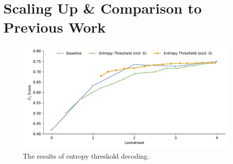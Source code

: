 \documentclass[bsc,deptreport,ai]{infthesis} %
\begin{document}
\section{Scaling Up \& Comparison to Previous Work}
\begin{figure}[!htb]
\centering
\includegraphics[width=.9\textwidth]{entropy.pdf}
\caption{The results of entropy threshold decoding.}
\label{fig:truncquant}
\end{figure}
\end{document}
